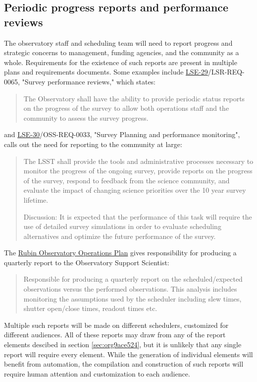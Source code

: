\subsection{Periodic progress reports and performance reviews}
\label{sec:org761952b}
The observatory staff and scheduling team will need to report progress and strategic concerns to management, funding agencies, and the community as a whole. Requirements for the existence of such reports are present in multiple plans and requirements documents. Some examples include \href{https://ls.st/lse-29}{LSE-29}/LSR-REQ-0065, "Survey performance reviews," which states:
\begin{quote}
The Observatory shall have the ability to provide periodic status reports on the progress of the survey to allow both operations staff and the community to assess the survey progress.
\end{quote}
and \href{https://ls.st/lse-30}{LSE-30}/OSS-REQ-0033, "Survey Planning and performance monitoring", calls out the need for reporting to the community at large:
\begin{quote}
The LSST shall provide the tools and administrative processes necessary to monitor the progress of the ongoing survey, provide reports on the progress of the survey, respond to feedback from the science community, and evaluate the impact of changing science priorities over the 10 year survey lifetime.

Discussion: It is expected that the performance of this task will require the use of detailed survey simulations in order to evaluate scheduling alternatives and optimize the future performance of the survey.
\end{quote}

The \href{https://docushare.lsst.org/docushare/dsweb/Get/Document-36797/Rubin\%20Observatory\%20Operations\%20Plan\%20April\%202020.pdf}{Rubin Observatory Operations Plan} gives responsibility for producing a quarterly report to the Observatory Support Scientist:
\begin{quote}
Responsible for producing a quarterly report on the scheduled/expected observations versus the performed observations. This analysis includes monitoring the assumptions used by the scheduler including slew times, shutter open/close times, readout times etc. 
\end{quote}

Multiple such reports will be made on different schedulers, customized for different audiences.
All of these reports may draw from any of the report elements descibed in section \ref{sec:org9ace524}, but it is unlikely that any single report will require every element.
While the generation of individual elements will benefit from automation, the compilation and construction of such reports will require human attention and customization to each audience.

